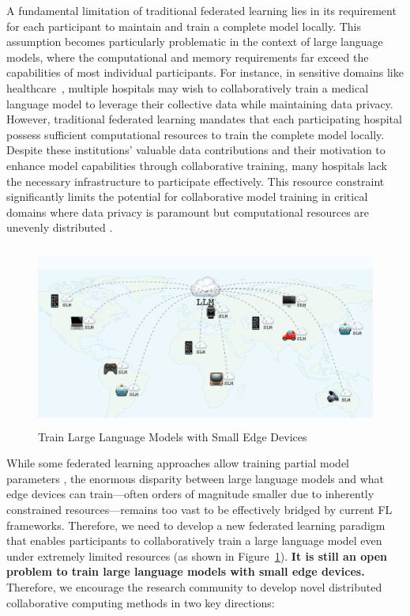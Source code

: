 A fundamental limitation of traditional federated learning lies in its requirement for each participant to maintain and train a complete model locally. This assumption becomes particularly problematic in the context of large language models, where the computational and memory requirements far exceed the capabilities of most individual participants. For instance, in sensitive domains like healthcare~\cite{bolton2024biomedlm}, multiple hospitals may wish to collaboratively train a medical language model to leverage their collective data while maintaining data privacy. However, traditional federated learning mandates that each participating hospital possess sufficient computational resources to train the complete model locally. Despite these institutions' valuable data contributions and their motivation to enhance model capabilities through collaborative training, many hospitals lack the necessary infrastructure to participate effectively. This resource constraint significantly limits the potential for collaborative model training in critical domains where data privacy is paramount but computational resources are unevenly distributed \cite{kairouz2021advances}. 
\begin{figure}
    \centering
    \includegraphics[width=1\linewidth]{./figs/fedllm.pdf}
    \vspace{-20pt}
    \caption{Train Large Language Models with Small Edge Devices}
    \label{fig:fedllm}
\end{figure}
While some federated learning approaches allow training partial model parameters \cite{horvath2021fjord,alam2022fedrolex}, the enormous disparity between large language models and what edge devices can train—often orders of magnitude smaller due to inherently constrained resources—remains too vast to be effectively bridged by current FL frameworks.
Therefore, we need to develop a new federated learning paradigm that enables participants to collaboratively train a large language model even under extremely limited resources (as shown in Figure~\ref{fig:fedllm}).
\textbf{It is still an open problem to train large language models with small edge devices.} Therefore, we encourage the research community to develop novel distributed collaborative computing methods in two key directions:

